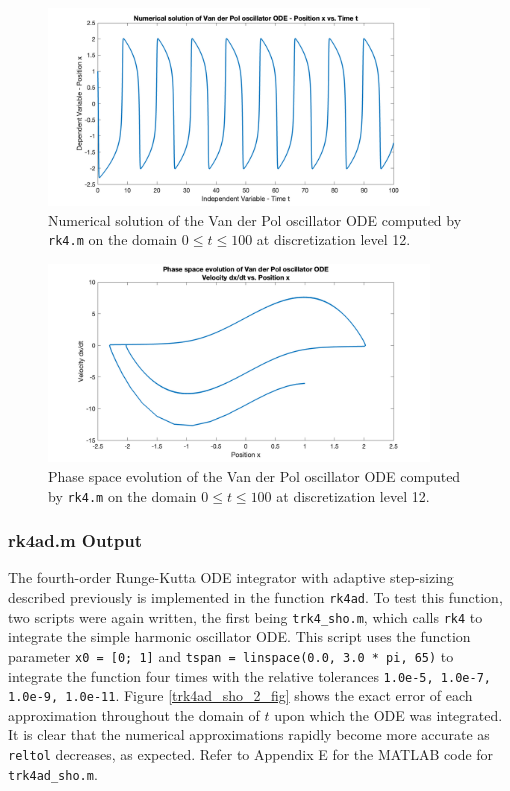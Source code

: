 \documentclass[10pt]{article}
\def\code#1{\texttt{#1}} %
\begin{document}
\begin{figure}[H]
\centering
\includegraphics[width=0.9\textwidth]{trk4_vdp_1.png}
\caption{Numerical solution of the Van der Pol oscillator ODE computed by \code{rk4.m} on the domain
$0 \leq t \leq 100$ at discretization level 12.}\label{trk4_vdp_1_fig}
\end{figure}

\begin{figure}[H]
\centering
\includegraphics[width=0.9\textwidth]{trk4_vdp_2.png}
\caption{Phase space evolution of the Van der Pol oscillator ODE computed by \code{rk4.m} on the domain
$0 \leq t \leq 100$ at discretization level 12.}\label{trk4_vdp_2_fig}
\end{figure}

\subsubsection*{rk4ad.m Output}

The fourth-order Runge-Kutta ODE integrator with adaptive step-sizing described previously is 
implemented in the function \code{rk4ad}. To test this function, two scripts were again written, the 
first being \code{trk4\_sho.m}, which calls \code{rk4} to integrate the simple harmonic oscillator ODE. 
This script uses the function parameter \code{x0 = [0; 1]} and \code{tspan = linspace(0.0, 3.0 * pi, 65)} 
to integrate the function four times with the relative tolerances \code{1.0e-5, 1.0e-7, 1.0e-9, 1.0e-11}. 
Figure \ref{trk4ad_sho_2_fig} shows the exact error of each approximation throughout the domain of $t$ 
upon which the ODE was integrated. It is clear that the numerical approximations rapidly become more 
accurate as \code{reltol} decreases, as expected. Refer to Appendix E for the MATLAB code for 
\code{trk4ad\_sho.m}.
\end{document}
